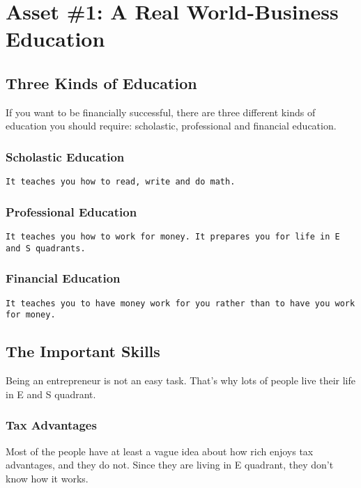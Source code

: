 \documentclass[a4paper, 12pt]{report}
\begin{document}
   \chapter{Asset \#1: A Real World-Business Education}
   \section{Three Kinds of Education}
   If you want to be financially successful, there are three different kinds of education you should require: scholastic, professional and financial education.
   \subsection{Scholastic Education}
     \begin{lstlisting}[style=latexFrameTB]
               It teaches you how to read, write and do math.
    \end{lstlisting}
    \subsection{Professional Education}
     \begin{lstlisting}[style=latexFrameTB]
               It teaches you how to work for money. It prepares you for life in E and S quadrants.
    \end{lstlisting}
    \subsection{Financial Education}
     \begin{lstlisting}[style=latexFrameTB]
               It teaches you to have money work for you rather than to have you work for money.
    \end{lstlisting}
    
    
    \section{The Important Skills}
    Being an entrepreneur is not an easy task. That's why lots of people live their life in E and S quadrant.
    \subsection{Tax Advantages}
    Most of the people have at least a vague idea about how rich enjoys tax advantages, and they do not. Since they are living in E quadrant, they don't know how it works.
   
\end{document}
